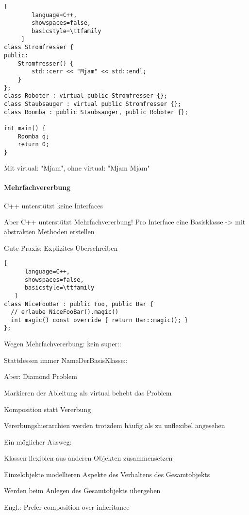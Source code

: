 \documentclass[10pt]{article}
\begin{document}
\begin{itemize*}
\begin{lstlisting}[
        language=C++,
        showspaces=false,
        basicstyle=\ttfamily
     ]
class Stromfresser {
public:
    Stromfresser() {
        std::cerr << "Mjam" << std::endl;
    }
};
class Roboter : virtual public Stromfresser {};
class Staubsauger : virtual public Stromfresser {};
class Roomba : public Staubsauger, public Roboter {};

int main() {
    Roomba q;
    return 0;
}
\end{lstlisting}
Mit virtual: "Mjam", ohne virtual: "Mjam Mjam"


\paragraph{Mehrfachvererbung}

\begin{itemize*}
  \item C++ unterstützt keine Interfaces
  \item Aber C++ unterstützt Mehrfachvererbung! Pro Interface eine Basisklasse -> mit abstrakten Methoden erstellen
  \item Gute Praxis: Explizites Überschreiben
  \begin{lstlisting}[
      language=C++,
      showspaces=false,
      basicstyle=\ttfamily
   ]
class NiceFooBar : public Foo, public Bar {
  // erlaube NiceFooBar().magic()
  int magic() const override { return Bar::magic(); }
};
\end{lstlisting}
  
  \begin{itemize*}
    \item Wegen Mehrfachvererbung: kein super::
    \item Stattdessen immer NameDerBasisKlasse::
  \end{itemize*}
  \item Aber: Diamond Problem
  \begin{itemize*}
    \item Markieren der Ableitung als virtual behebt das Problem
  \end{itemize*}
\end{itemize*}

Komposition statt Vererbung
\begin{itemize*}
  \item Vererbungshierarchien werden trotzdem häufig als zu unflexibel angesehen
  \item Ein möglicher Ausweg:
  \begin{itemize*}
    \item Klassen flexiblen aus anderen Objekten zusammensetzen
    \item Einzelobjekte modellieren Aspekte des Verhaltens des Gesamtobjekts
    \item Werden beim Anlegen des Gesamtobjekts übergeben
  \end{itemize*}
  \item Engl.: Prefer composition over inheritance
\end{itemize*}


\end{itemize*}
\end{document}
